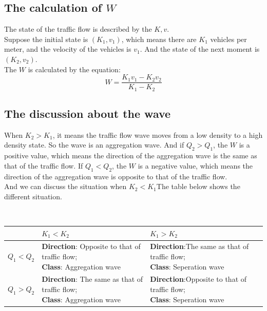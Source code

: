 \documentclass{mcmthesis}
\begin{document}
\subsection{The calculation of $W$}
\indent The state of the traffic flow is described by the $K,v$.\\
\indent Suppose the initial state is $(K_{1}, v_{1})$, which means there are $K_{1}$ vehicles per meter, and the velocity of the vehicles is $v_{1}$. And the state of the next moment is $(K_{2}, v_{2})$. \\
\indent The $W$ is calculated by the equation:
\begin{equation}
	W=\frac{K_{1}v_{1}-K_{2}v_{2}}{K_{1}-K_{2}}
\end{equation}
\subsection{The discussion about the wave}
When $K_{2}>K_{1}$, it means the traffic flow wave moves from a low density to a high density state. So the wave is an aggregation wave. And if $ Q_{2}>Q_{1} $, the $W$ is a positive value, which means the direction of the aggregation wave is the same as that of the traffic flow. If $ Q_{1}<Q_{2} $, the $W$ is a negative value, which means the direction of the aggregation wave is opposite to that of the traffic flow. \\
\indent And we can discuss the situation when $K_{2}<K_{1}$The table below shows the different situation.\\
\begin{table}[H]
        \setlength{\abovecaptionskip}{0pt}
        \setlength{\belowcaptionskip}{0pt}
		\\
        \begin{tabular}{p{2.7cm}<{\centering}|p{5.5cm}<{\centering}|p{5.5cm}<{\centering}|}
		\hline
		\rowcolor[gray]{0.9}\bf{}	&\bf{$K_{1}<K_{2}$}&\bf{$K_{1}>K_{2}$}	\\
		\hline
		$ Q_{1}<Q_{2} $	 & \makecell[{}{p{5.5cm}}]{\textbf{Direction}: Opposite to that of traffic flow;\\  \textbf{Class}: Aggregation wave  } &\makecell[{}{p{5.5cm}}]{\textbf{Direction}:The same as that of traffic flow;\\ \textbf{Class}: Seperation wave}\\
		\hline
		$Q_{1}>Q_{2} $  & \makecell[{}{p{5.5cm}}]{\textbf{Direction}: The same as that of traffic flow;\\  \textbf{Class}: Aggregation wave  }  
		&\makecell[{}{p{5.5cm}}]{\textbf{Direction}:Opposite to that of traffic flow;\\ \textbf{Class}: Seperation wave}
	\end{tabular}
\end{table}
\end{document}
